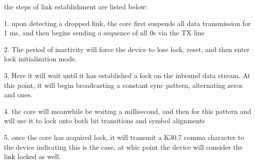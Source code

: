 the steps of link establishment are listed below: 

1. upon  detecting a  dropped link, the  core first suspends  all data
transmission for  1 ms, and then  begins sending a sequence  of all 0s
via the TX line

2. The period of inactivity will force the device to lose lock, reset,
and then enter lock initialization mode.

3. Here it will wait until it has established a lock on the inbound
data stream. At this point, it will begin broadcasting a constant sync
pattern, alternating zeros and ones.

4. the core will meanwhile be waiting a millisecond, and then for this
pattern and will use it to lock onto both bit transitions and symbol
alignments

5. once the core has acquired lock, it will transmit a K30.7 comma
character to the device indicating this is the case, at whic point the
device will consider the link locked as well.

